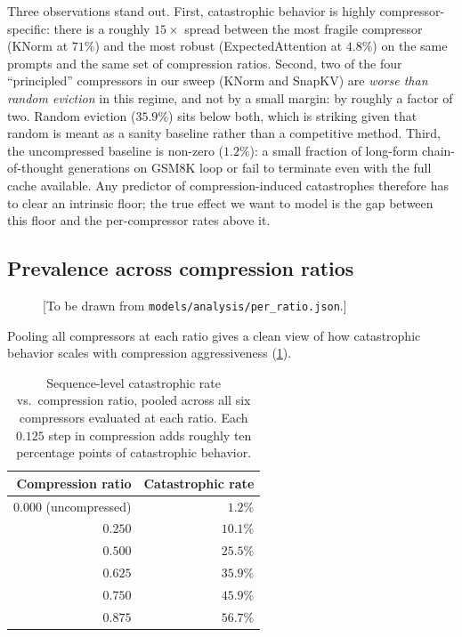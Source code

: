 \documentclass[11pt,a4paper]{article}
\begin{document}
Three observations stand out. First, catastrophic behavior is highly compressor-specific: there is a roughly $15\times$ spread between the most fragile compressor (KNorm at $71\%$) and the most robust (ExpectedAttention at $4.8\%$) on the same prompts and the same set of compression ratios. Second, two of the four ``principled'' compressors in our sweep (KNorm and SnapKV) are \emph{worse than random eviction} in this regime, and not by a small margin: by roughly a factor of two. Random eviction ($35.9\%$) sits below both, which is striking given that random is meant as a sanity baseline rather than a competitive method. Third, the uncompressed baseline is non-zero ($1.2\%$): a small fraction of long-form chain-of-thought generations on GSM8K loop or fail to terminate even with the full cache available. Any predictor of compression-induced catastrophes therefore has to clear an intrinsic floor; the true effect we want to model is the gap between this floor and the per-compressor rates above it.

\subsection{Prevalence across compression ratios}
\label{sec:failures:per-ratio}

\begin{figure}[H]
  \centering
  \caption{[To be drawn from \texttt{models/analysis/per\_ratio.json}.]}
  \label{fig:per-ratio}
\end{figure}

Pooling all compressors at each ratio gives a clean view of how catastrophic behavior scales with compression aggressiveness (\cref{tab:per-ratio}).

\begin{table}[H]
\centering
\small
\begin{tabular}{rr}
\toprule
\textbf{Compression ratio} & \textbf{Catastrophic rate} \\
\midrule
$0.000$ (uncompressed) & $1.2\%$ \\
$0.250$ & $10.1\%$ \\
$0.500$ & $25.5\%$ \\
$0.625$ & $35.9\%$ \\
$0.750$ & $45.9\%$ \\
$0.875$ & $56.7\%$ \\
\bottomrule
\end{tabular}
\caption{Sequence-level catastrophic rate vs.\ compression ratio, pooled across all six compressors evaluated at each ratio. Each $0.125$ step in compression adds roughly ten percentage points of catastrophic behavior.}
\label{tab:per-ratio}
\end{table}
\end{document}
